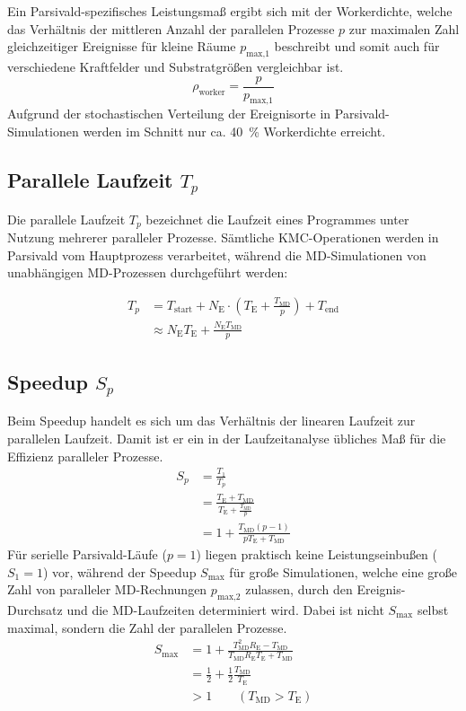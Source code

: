 Ein Parsivald-spezifisches Leistungsmaß ergibt sich mit der Workerdichte, welche das Verhältnis der mittleren Anzahl der parallelen Prozesse $p$ zur maximalen Zahl gleichzeitiger Ereignisse für kleine Räume $p_\text{max,1}$ beschreibt und somit auch für verschiedene Kraftfelder und Substratgrößen vergleichbar ist.
\begin{equation}
  \rho_\text{worker} = \frac{p}{p_\text{max,1}}
\end{equation}
Aufgrund der stochastischen Verteilung der Ereignisorte in Parsivald-Simulationen werden im Schnitt nur ca. \SI{40}{\percent} Workerdichte erreicht.

\subsection{Parallele Laufzeit $T_p$}

Die parallele Laufzeit $T_p$ bezeichnet die Laufzeit eines Programmes unter Nutzung mehrerer paralleler Prozesse.
Sämtliche KMC-Operationen werden in Parsivald vom Hauptprozess verarbeitet, während die MD-Simulationen von unabhängigen MD-Prozessen durchgeführt werden:

\begin{align}
  T_p & = T_\text{start} + N_\text{E} \cdot (T_\text{E} + \frac{T_\text{MD}}{p}) + T_\text{end} \\
      & \approx N_\text{E} T_\text{E} + \frac{N_\text{E} T_\text{MD}}{p}
\end{align}

\subsection{Speedup $S_p$}

Beim Speedup handelt es sich um das Verhältnis der linearen Laufzeit zur parallelen Laufzeit.
Damit ist er ein in der Laufzeitanalyse übliches Maß für die Effizienz paralleler Prozesse.
\begin{align}
  S_p & = \frac{T_1}{T_p}                                                     \\
      & = \frac{T_\text{E} + T_\text{MD}}{T_\text{E} + \frac{T_\text{MD}}{p}} \\
      & = 1 + \frac{T_\text{MD} (p - 1)}{p T_\text{E} + T_\text{MD}}
\end{align}
Für serielle Parsivald-Läufe ($p=1$) liegen praktisch keine Leistungseinbußen ($S_1=1$) vor, während der Speedup $S_\text{max}$ für große Simulationen, welche eine große Zahl von paralleler MD-Rechnungen $p_\text{max,2}$ zulassen, durch den Ereignis-Durchsatz und die MD-Laufzeiten determiniert wird.
Dabei ist nicht $S_\text{max}$ selbst maximal, sondern die Zahl der parallelen Prozesse.
\begin{align}
  S_\text{max} & = 1 + \frac{T_\text{MD}^2 R_\text{E} - T_\text{MD}}{T_\text{MD} R_\text{E} T_\text{E} + T_\text{MD}} \\
  & = \frac{1}{2} + \frac{1}{2}\frac{T_\text{MD}}{T_\text{E}} \\
  & > 1 \qquad(T_\text{MD} > T_\text{E})
\end{align}

